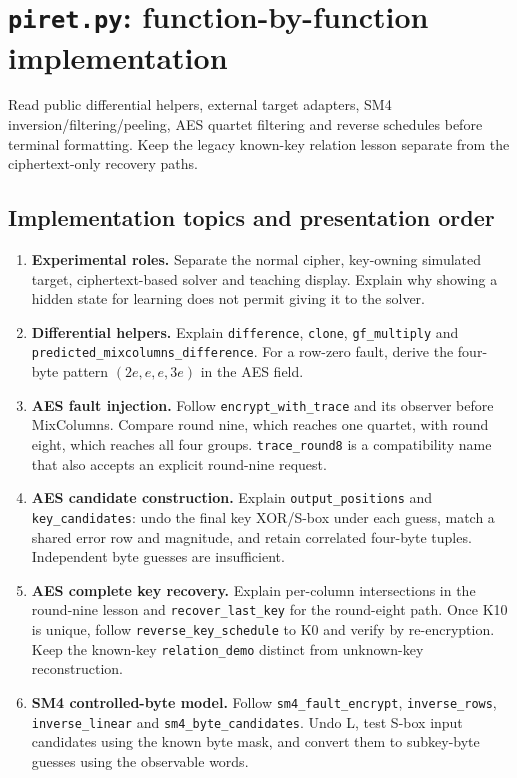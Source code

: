 \section{\texttt{piret.py}: function-by-function implementation}
Read public differential helpers, external target adapters, SM4 inversion/filtering/peeling, AES quartet filtering and reverse schedules before terminal formatting. Keep the legacy known-key relation lesson separate from the ciphertext-only recovery paths.

\subsection{Implementation topics and presentation order}
\begin{enumerate}
\item \textbf{Experimental roles.} Separate the normal cipher, key-owning simulated target, ciphertext-based solver and teaching display. Explain why showing a hidden state for learning does not permit giving it to the solver.
\item \textbf{Differential helpers.} Explain \texttt{difference}, \texttt{clone}, \texttt{gf\_multiply} and \texttt{predicted\_mixcolumns\_difference}. For a row-zero fault, derive the four-byte pattern $(2e,e,e,3e)$ in the AES field.
\item \textbf{AES fault injection.} Follow \texttt{encrypt\_with\_trace} and its observer before MixColumns. Compare round nine, which reaches one quartet, with round eight, which reaches all four groups. \texttt{trace\_round8} is a compatibility name that also accepts an explicit round-nine request.
\item \textbf{AES candidate construction.} Explain \texttt{output\_positions} and \texttt{key\_candidates}: undo the final key XOR/S-box under each guess, match a shared error row and magnitude, and retain correlated four-byte tuples. Independent byte guesses are insufficient.
\item \textbf{AES complete key recovery.} Explain per-column intersections in the round-nine lesson and \texttt{recover\_last\_key} for the round-eight path. Once K10 is unique, follow \texttt{reverse\_key\_schedule} to K0 and verify by re-encryption. Keep the known-key \texttt{relation\_demo} distinct from unknown-key reconstruction.
\item \textbf{SM4 controlled-byte model.} Follow \texttt{sm4\_fault\_encrypt}, \texttt{inverse\_rows}, \texttt{inverse\_linear} and \texttt{sm4\_byte\_candidates}. Undo L, test S-box input candidates using the known byte mask, and convert them to subkey-byte guesses using the observable words.

\end{enumerate}
